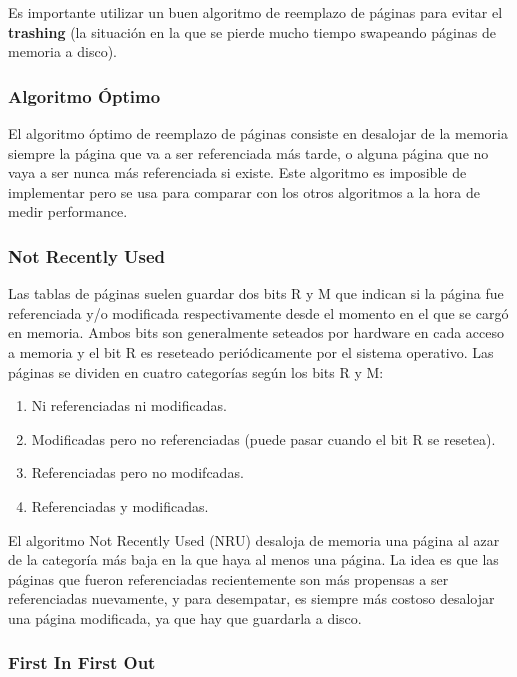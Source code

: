 \documentclass{article}
\begin{document}
Es importante utilizar un buen algoritmo de reemplazo de p\'aginas para evitar el \textbf{trashing} (la situaci\'on en la que se pierde mucho tiempo swapeando p\'aginas de memoria a disco).

\subsubsection{Algoritmo \'Optimo}

El algoritmo \'optimo de reemplazo de p\'aginas consiste en desalojar de la memoria siempre la p\'agina que va a ser referenciada m\'as tarde, o alguna p\'agina que no vaya a ser nunca m\'as referenciada si existe. Este algoritmo es imposible de implementar pero se usa para comparar con los otros algoritmos a la hora de medir performance.

\subsubsection{Not Recently Used}

Las tablas de p\'aginas suelen guardar dos bits R y M que indican si la p\'agina fue referenciada y/o modificada respectivamente desde el momento en el que se carg\'o en memoria. Ambos bits son generalmente seteados por hardware en cada acceso a memoria y el bit R es reseteado peri\'odicamente por el sistema operativo. Las p\'aginas se dividen en cuatro categor\'ias seg\'un los bits R y M:

\begin{enumerate}
\item Ni referenciadas ni modificadas.
\item Modificadas pero no referenciadas (puede pasar cuando el bit R se resetea).
\item Referenciadas pero no modifcadas.
\item Referenciadas y modificadas.
\end{enumerate}

El algoritmo Not Recently Used (NRU) desaloja de memoria una p\'agina al azar de la categor\'ia m\'as baja en la que haya al menos una p\'agina. La idea es que las p\'aginas que fueron referenciadas recientemente son m\'as propensas a ser referenciadas nuevamente, y para desempatar, es siempre m\'as costoso desalojar una p\'agina modificada, ya que hay que guardarla a disco.

\subsubsection{First In First Out}
\end{document}
